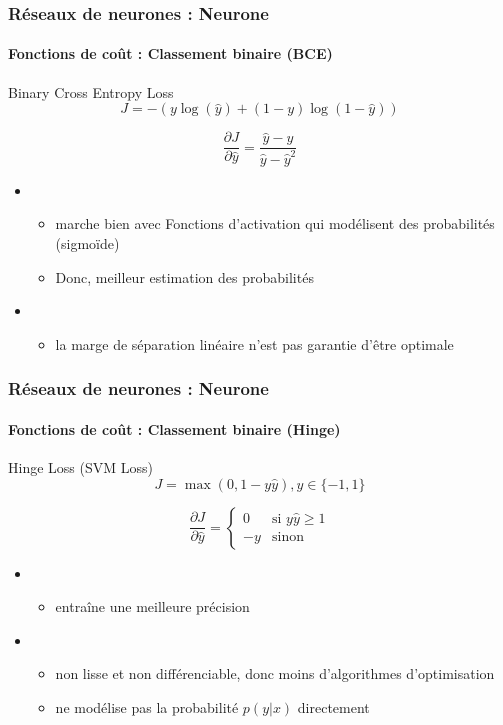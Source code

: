 \documentclass[xcolor=table]{beamer}
\begin{document}
\begin{frame}
\frametitle{Réseaux de neurones : Neurone}
\framesubtitle{Fonctions de coût : Classement binaire (BCE)}

\begin{block}{Binary Cross Entropy Loss}
	\[J = - (y \log(\hat{y}) + (1 - y) \log(1 - \hat{y}))\]
	
	\[
	\frac{\partial J}{\partial \hat{y}} = \frac{\hat{y} - y}{\hat{y} - \hat{y}^2}
	\]
\end{block}

\begin{itemize}
	\item {}
	\begin{itemize}
		\item marche bien avec Fonctions d'activation qui modélisent des probabilités (sigmoïde)
		\item Donc, meilleur estimation des probabilités
	\end{itemize}
	\item {}
	\begin{itemize}
		\item la marge de séparation linéaire n'est pas garantie d'être optimale
	\end{itemize}
\end{itemize}

\end{frame}

\begin{frame}
\frametitle{Réseaux de neurones : Neurone}
\framesubtitle{Fonctions de coût : Classement binaire (Hinge)}

\begin{block}{Hinge Loss (SVM Loss)}
	\[J = \max(0, 1 - y \hat{y}), y \in \{-1, 1\}\]
	
	\[
	\frac{\partial J}{\partial \hat{y}} = 
	\begin{cases}
	0 & \text{si } y \hat{y} \ge 1 \\
	-y & \text{sinon}
	\end{cases}
	\]
\end{block}

\begin{itemize}
	\item {}
	\begin{itemize}
		\item entraîne une meilleure précision
	\end{itemize}
	\item {}
	\begin{itemize}
		\item non lisse et non différenciable, donc moins d'algorithmes d'optimisation
		\item ne modélise pas la probabilité $p(y|x)$ directement
	\end{itemize}
\end{itemize}

\end{frame}
\end{document}

